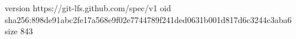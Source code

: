 version https://git-lfs.github.com/spec/v1
oid sha256:898de91abc2fe17a568e9f02e7744789f241ded0631b001d817d6c3244c3aba6
size 843
